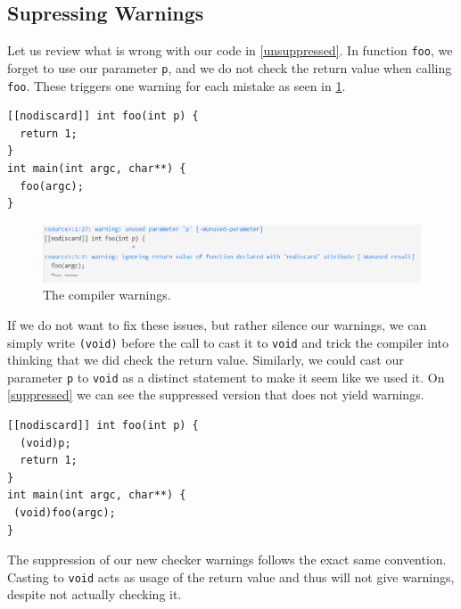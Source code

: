 \subsection{Supressing Warnings}

Let us review what is wrong with our code in \cref{unsuppressed}. In function \texttt{foo}, we forget to use our parameter \texttt{p}, and we do not
check the return value when calling \texttt{foo}. These triggers one warning for each mistake as seen in \cref{fig:compiler-warning}.

\begin{listing}[H]
\begin{verbatim}
[[nodiscard]] int foo(int p) {
  return 1;
}
int main(int argc, char**) {
  foo(argc);
}
\end{verbatim}
\caption{An example of both unused parameter and ignored return value with nodiscard.}\label{unsuppressed}
\end{listing}

\begin{figure}[H]
	\includegraphics[width=\linewidth]{images/nodiscard_warning.png}
	\caption{The compiler warnings.}
	\label{fig:compiler-warning}
\end{figure}

If we do not want to fix these issues, but rather silence our warnings, we can simply write \texttt{(void)} before the call
to cast it to \texttt{void} and trick the compiler into thinking that we did check the return value.
Similarly, we could cast our parameter \texttt{p} to \texttt{void} as a distinct statement to make it seem like we used it. On \cref{suppressed}
we can see the suppressed version that does not yield warnings.

\begin{listing}[H]
\begin{verbatim}
[[nodiscard]] int foo(int p) {
  (void)p;
  return 1;
}
int main(int argc, char**) {
 (void)foo(argc);
}
\end{verbatim}
\caption{The same example, now with suppressed warnings.}\label{suppressed}
\end{listing}

The suppression of our new checker warnings follows the exact same convention. Casting to \texttt{void} acts as usage of the return
value and thus will not give warnings, despite not actually checking it.

